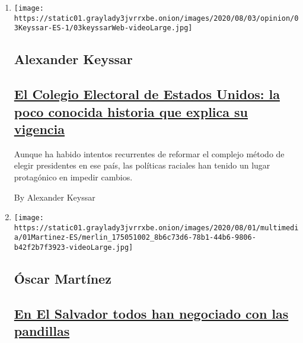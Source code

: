 \begin{enumerate}
\def\labelenumi{\arabic{enumi}.}
\item
  \texttt{[image: https://static01.graylady3jvrrxbe.onion/images/2020/08/03/opinion/03Keyssar-ES-1/03keyssarWeb-videoLarge.jpg]}

  \hypertarget{alexander-keyssar}{%
  \subsection{Alexander Keyssar}\label{alexander-keyssar}}

  \hypertarget{el-colegio-electoral-de-estados-unidos-la-poco-conocida-historia-que-explica-su-vigencia}{%
  \subsection{\texorpdfstring{\href{/es/2020/08/03/espanol/opinion/colegio-electoral-estados-unidos.html}{El
  Colegio Electoral de Estados Unidos: la poco conocida historia que
  explica su
  vigencia}}{El Colegio Electoral de Estados Unidos: la poco conocida historia que explica su vigencia}}\label{el-colegio-electoral-de-estados-unidos-la-poco-conocida-historia-que-explica-su-vigencia}}

  Aunque ha habido intentos recurrentes de reformar el complejo método
  de elegir presidentes en ese país, las políticas raciales han tenido
  un lugar protagónico en impedir cambios.

  By Alexander Keyssar
\item
  \texttt{[image: https://static01.graylady3jvrrxbe.onion/images/2020/08/01/multimedia/01Martinez-ES/merlin\_175051002\_8b6c73d6-78b1-44b6-9806-b42f2b7f3923-videoLarge.jpg]}

  \hypertarget{uxf3scar-martuxednez}{%
  \subsection{Óscar Martínez}\label{uxf3scar-martuxednez}}

  \hypertarget{en-el-salvador-todos-han-negociado-con-las-pandillas}{%
  \subsection{\texorpdfstring{\href{/es/2020/08/02/espanol/opinion/pandillas-el-salvador.html}{En
  El Salvador todos han negociado con las
  pandillas}}{En El Salvador todos han negociado con las pandillas}}\label{en-el-salvador-todos-han-negociado-con-las-pandillas}}


\end{enumerate}
